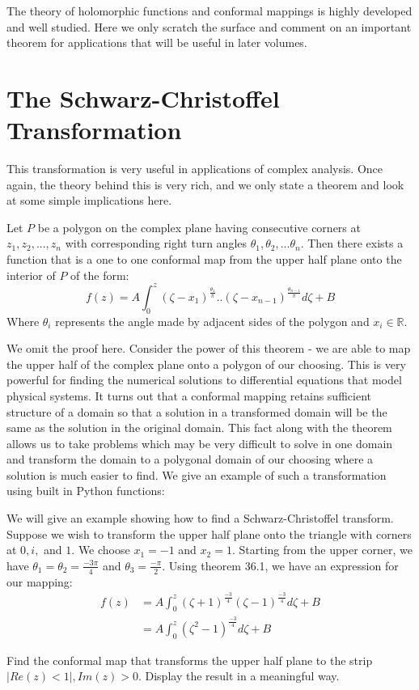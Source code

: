 The theory of holomorphic functions and conformal mappings is highly developed and well studied.  Here we only scratch the surface and comment on an important theorem for applications that will be useful in later volumes.

\section*{The Schwarz-Christoffel Transformation}
This transformation is very useful in applications of complex analysis.  Once again, the theory behind this is very rich, and we only state a theorem and look at some simple implications here.

\begin{theorem}  Let $P$ be a polygon on the complex plane having consecutive corners at $z_1, z_2, ..., z_n$ with corresponding right turn angles $\theta_1, \theta_2,...\theta_n$.  Then there exists a function that is a one to one conformal map from the upper half plane onto the interior of $P$ of the form:
\[
f(z) = A\int_0^z (\zeta - x_1)^{\frac{\theta_1}{\pi}}..(\zeta - x_{n-1})^{\frac{\theta_{n-1}}{\pi}}d\zeta + B
\]
Where $\theta_i$ represents the angle made by adjacent sides of the polygon and $x_i \in \mathbb{R}$.
\end{theorem}

We omit the proof here.  Consider the power of this theorem - we are able to map the upper half of the complex plane onto a polygon of our choosing.  This is very powerful for finding the numerical solutions to differential equations that model physical systems.  It turns out that a conformal mapping retains sufficient structure of a domain so that a solution in a transformed domain will be the same as the solution in the original domain.  This fact along with the theorem allows us to take problems which may be very difficult to solve in one domain and transform the domain to a polygonal domain of our choosing where a solution is much easier to find.  We give an example of such a transformation using built in Python functions:

\begin{example}
We will give an example showing how to find a Schwarz-Christoffel transform.  Suppose we wish to transform the upper half plane onto the triangle with corners at $0, i,$ and $1$.  We choose $x_1 = -1$ and $x_2 = 1$.  Starting from the upper corner, we have $\theta_1 = \theta_2 = \frac{-3\pi}{4}$ and $\theta_3 = \frac{-\pi}{2}$.  Using theorem 36.1, we have an expression for our mapping:
\begin{align*}
f(z) &= A\int_0^z(\zeta + 1)^{\frac{-3}{4}}(\zeta - 1)^{\frac{-3}{4}}d\zeta + B \\
	 &= A\int_0^z(\zeta^2 - 1)^{\frac{-3}{4}}d\zeta + B
\end{align*}

\end{example}

\begin{problem}
Find the conformal map that transforms the upper half plane to the strip $|Re(z) < 1|, Im(z) > 0$.  Display the result in a meaningful way.
\end{problem}
